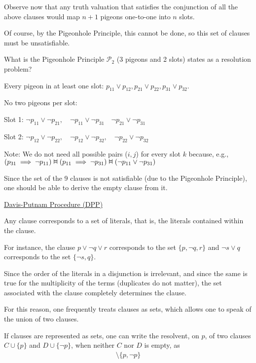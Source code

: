 \documentclass{article}
\newcommand{\vDashv}{%
  \mathrel{%
    \text{%
      \ooalign{$\vDash$\cr\reflectbox{$\vDash$}\cr}%
    }%
  }%
}
\begin{document}
Observe now that any truth valuation that satisfies the conjunction of all the above clauses would map $n+1$ pigeons one-to-one into $n$ slots.

Of course, by the Pigeonhole Principle, this cannot be done, so this set of clauses must be unsatisfiable.

What is the Pigeonhole Principle $\mathcal{P}_2$ (3 pigeons and 2 slots) states as a resolution problem?

Every pigeon in at least one slot: $p_{11} \vee p_{12}, p_{21} \vee p_{22}, p_{31} \vee p_{32}$.

No two pigeons per slot:

Slot 1: $\neg p_{11} \vee \neg p_{21}, \quad \neg p_{11} \vee \neg p_{31} \quad \neg p_{21} \vee \neg p_{31}$

Slot 2: $\neg p_{12} \vee \neg p_{22}, \quad \neg p_{12} \vee \neg p_{32}, \quad \neg p_{22} \vee \neg p_{32}$

Note: We do not need all possible pairs ($i,j$) for every slot $k$ because, e.g., $(p_{31} \implies \neg p_{11}) \vDashv (p_{11} \implies \neg p_{31}) \vDashv (\neg p_{11} \vee \neg p_{31})$

Since the set of the 9 clauses is not satisfiable (due to the Pigeonhole Principle), one should be able to derive the empty clause from it.

\underline{Davis-Putnam Procedure (DPP)}

Any clause corresponds to a set of literals, that is, the literals contained within the clause.

For instance, the clause $p \vee \neg q \vee r$ corresponds to the set $\{p, \neg q, r\}$ and $\neg s \vee q$ corresponds to the set $\{\neg s, q\}$.

Since the order of the literals in a disjunction is irrelevant, and since the same is true for the multiplicity of the terms (duplicates do not matter), the set associated with the clause completely determines the clause.

For this reason, one frequently treats clauses as sets, which allows one to speak of the union of two clauses.

If clauses are represented as sets, one can write the resolvent, on $p$, of two clauses $C \cup \{p\}$ and $D \cup \{\neg p\}$, when neither $C$ nor $D$ is empty, as
\begin{align*}
[(C \cup \{p\}) \cup (D \cup \{\neg p\})] \setminus \{p, \neg p\}
\end{align*}
\end{document}
